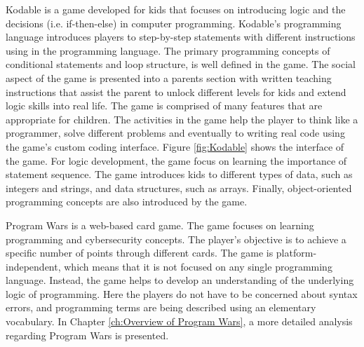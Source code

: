 Kodable \cite{Kodable} is a game developed for kids that focuses on introducing logic and the decisions (i.e. if-then-else) in computer programming. Kodable’s programming language introduces players to step-by-step statements with different instructions using in the programming language. The primary programming concepts of conditional statements and loop structure, is well defined in the game. The social aspect of the game is presented into a parents section with written teaching instructions that assist the parent to unlock different levels for kids and extend logic skills into real life. The game is comprised of many features that are appropriate for children. The activities in the game help the player to think like a programmer, solve different problems and eventually to writing real code using the game’s custom coding interface. Figure \ref{fig:Kodable} shows the interface of the game. For logic development, the game focus on learning the importance of statement sequence. The game introduces kids to different types of data, such as integers and strings, and data structures, such as arrays. Finally, object-oriented programming concepts are also introduced by the game. 


Program Wars \cite{ProgramWars} is a web-based card game. The game focuses on learning programming and cybersecurity concepts. The player’s objective is to achieve a specific number of points through different cards. The game is platform-independent, which means that it is not focused on any single programming language. Instead, the game helps to develop an understanding of the underlying logic of programming. Here the players do not have to be concerned about syntax errors, and programming terms are being described using an elementary vocabulary. In Chapter \ref{ch:Overview of Program Wars}, a more detailed analysis regarding Program Wars is presented.   

